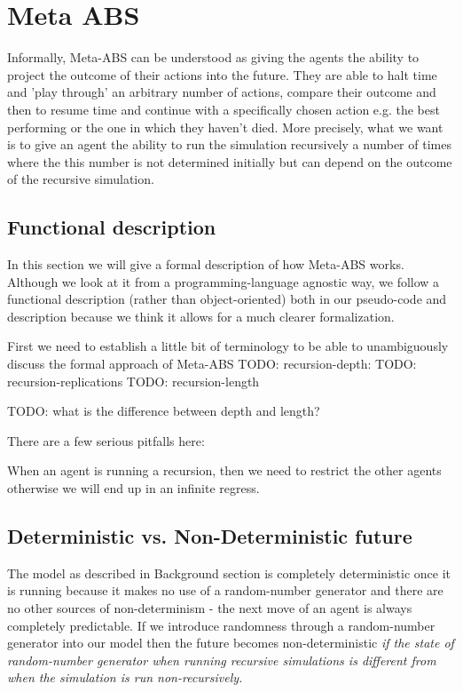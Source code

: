\section{Meta ABS}
Informally, Meta-ABS can be understood as giving the agents the ability to project the outcome of their actions into the future. They are able to halt time and 'play through' an arbitrary number of actions, compare their outcome and then to resume time and continue with a specifically chosen action e.g. the best performing or the one in which they haven't died. 
More precisely, what we want is to give an agent the ability to run the simulation recursively a number of times where the this number is not determined initially but can depend on the outcome of the recursive simulation. 

\subsection{Functional description}
In this section we will give a formal description of how Meta-ABS works. Although we look at it from a programming-language agnostic way, we follow a functional description (rather than object-oriented) both in our pseudo-code and description because we think it allows for a much clearer formalization.

First we need to establish a little bit of terminology to be able to unambiguously discuss the formal approach of Meta-ABS
TODO: recursion-depth:
TODO: recursion-replications
TODO: recursion-length

TODO: what is the difference between depth and length?

There are a few serious pitfalls here: 
\begin{enumeration}
	\item When an agent is running a recursion, then we need to restrict the other agents  otherwise we will end up in an infinite regress.
\end{enumeration}



\subsection{Deterministic vs. Non-Deterministic future}
The model as described in Background section is completely deterministic once it is running because it makes no use of a random-number generator and there are no other sources of non-determinism - the next move of an agent is always completely predictable. If we introduce randomness through a random-number generator into our model then the future becomes non-deterministic \textit{if the state of random-number generator when running recursive simulations is different from when the simulation is run non-recursively.}

